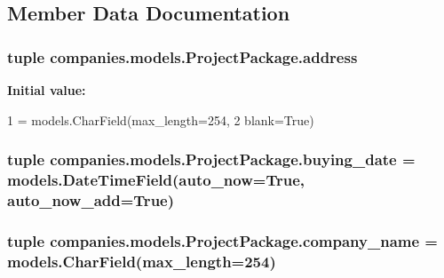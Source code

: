\subsection{Member Data Documentation}
\hypertarget{classcompanies_1_1models_1_1_project_package_a26aff808789e2c1b012cc1ab4dd760cf}{
\subsubsection[{address}]{\setlength{\rightskip}{0pt plus 5cm}tuple companies.\-models.\-Project\-Package.\-address\hspace{0.3cm}{\ttfamily [static]}}}\label{classcompanies_1_1models_1_1_project_package_a26aff808789e2c1b012cc1ab4dd760cf}
{\bfseries Initial value\-:}
\begin{DoxyCode}
1 = models.CharField(max\_length=254,
2                                blank=\textcolor{keyword}{True})
\end{DoxyCode}
\hypertarget{classcompanies_1_1models_1_1_project_package_afabcd61d965eb709da9dd1e28ce306f4}{
\subsubsection[{buying\-\_\-date}]{\setlength{\rightskip}{0pt plus 5cm}tuple companies.\-models.\-Project\-Package.\-buying\-\_\-date = models.\-Date\-Time\-Field(auto\-\_\-now=True, auto\-\_\-now\-\_\-add=True)\hspace{0.3cm}{\ttfamily [static]}}}\label{classcompanies_1_1models_1_1_project_package_afabcd61d965eb709da9dd1e28ce306f4}
\hypertarget{classcompanies_1_1models_1_1_project_package_a1b01856b8e731f478ec1d62e9f30c243}{
\subsubsection[{company\-\_\-name}]{\setlength{\rightskip}{0pt plus 5cm}tuple companies.\-models.\-Project\-Package.\-company\-\_\-name = models.\-Char\-Field(max\-\_\-length=254)\hspace{0.3cm}{\ttfamily [static]}}}\label{classcompanies_1_1models_1_1_project_package_a1b01856b8e731f478ec1d62e9f30c243}
